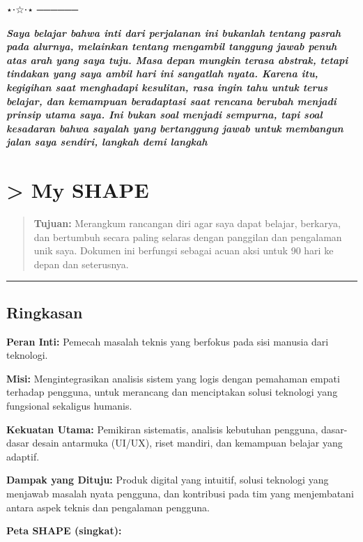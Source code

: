 \documentclass[
  letterpaper,
  DIV=11,
  numbers=noendperiod]{scrreprt}
\begin{document}
⋆⋅☆⋅⋆ ──────

\textbf{\emph{Saya belajar bahwa inti dari perjalanan ini bukanlah
tentang pasrah pada alurnya, melainkan tentang mengambil tanggung jawab
penuh atas arah yang saya tuju. Masa depan mungkin terasa abstrak,
tetapi tindakan yang saya ambil hari ini sangatlah nyata. Karena itu,
kegigihan saat menghadapi kesulitan, rasa ingin tahu untuk terus
belajar, dan kemampuan beradaptasi saat rencana berubah menjadi prinsip
utama saya. Ini bukan soal menjadi sempurna, tapi soal kesadaran bahwa
sayalah yang bertanggung jawab untuk membangun jalan saya sendiri,
langkah demi langkah}}


\chapter{\textgreater{} My SHAPE}\label{my-shape}

\begin{quote}
\textbf{Tujuan:} Merangkum rancangan diri agar saya dapat belajar,
berkarya, dan bertumbuh secara paling selaras dengan panggilan dan
pengalaman unik saya. Dokumen ini berfungsi sebagai acuan aksi untuk 90
hari ke depan dan seterusnya.
\end{quote}

\begin{center}\rule{0.5\linewidth}{0.5pt}\end{center}

\section{Ringkasan}\label{ringkasan}

\textbf{Peran Inti:} Pemecah masalah teknis yang berfokus pada sisi
manusia dari teknologi.

\textbf{Misi:} Mengintegrasikan analisis sistem yang logis dengan
pemahaman empati terhadap pengguna, untuk merancang dan menciptakan
solusi teknologi yang fungsional sekaligus humanis.

\textbf{Kekuatan Utama:} Pemikiran sistematis, analisis kebutuhan
pengguna, dasar-dasar desain antarmuka (UI/UX), riset mandiri, dan
kemampuan belajar yang adaptif.

\textbf{Dampak yang Dituju:} Produk digital yang intuitif, solusi
teknologi yang menjawab masalah nyata pengguna, dan kontribusi pada tim
yang menjembatani antara aspek teknis dan pengalaman pengguna.

\textbf{Peta SHAPE (singkat):}
\end{document}
